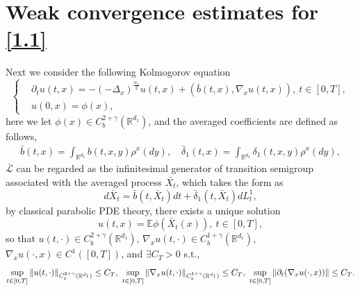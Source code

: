 \documentclass[11pt,reqno]{amsart}
\numberwithin{equation}{section}
\begin{document}
\section{Weak convergence estimates for \ref{1.1}}\label{wea-est}


Next we consider the following Kolmogorov equation
\begin{equation}\label{6.10}
	\left\{
	\begin{aligned}
		&\partial_{t}u(t,x)=	-(-\Delta_{x})^{\frac{\alpha_{1}}{2}}u(t,x)+( \bar{b}(t,x),\nabla_{x}u(t,x)) ,\ t\in[0,T],\\
		&u(0,x)=\phi(x),
	\end{aligned}
	\right.
\end{equation}
here we let  $\phi(x)\in C^{2+\gamma}_{b}(\mathbb{R}^{d_{1}})$, and the averaged coefficients are defined as follows, 
\begin{align*}
	\bar{b}(t,x)=\int_{\mathbb{R}^{d_{2}}}b(t,x,y)\rho^{x}(dy), \quad \bar{\delta}_{1}(t,x)=\int_{\mathbb{R}^{d_{2}}}\delta_{1}(t,x,y)\rho^{x}(dy),
\end{align*}
$\mathcal{\bar{L}}$ can be regarded as the infinitesimal generator of transition semigroup associated with the averaged process $\bar{X_{t}}$,  which takes the form as $$d\bar{X}_{t}=\bar{b}(t,\bar{X}_{t})dt+\bar{\delta}_{1}(t,\bar{X}_{t})dL_{t}^{1},$$by classical parabolic PDE theory, there exists a unique solution 
\begin{equation}\label{6.11}
	u(t,x)=\mathbb{E}\phi(\bar{X}_{t}(x)),\ t\in[0,T],
\end{equation}
so that $u(t,\cdot)\in C_{b}^{2+\gamma}(\mathbb{R}^{d_{1}})$, $\nabla_{x}u(t,\cdot)\in C_{b}^{1+\gamma}(\mathbb{R}^{d_{1}})$, $\nabla_{x}u(\cdot,x)\in C^{1}([0,T])$, and $\exists C_{T}>0$ s.t.,
\begin{equation}\label{6.12}
	\sup_{t\in [0,T]}\Arrowvert u(t,\cdot)\Arrowvert_{C_{b}^{2+\gamma}(\mathbb{R}^{d_{1}})}\leq C_{T},\  
	\sup_{t\in [0,T]}\Arrowvert \nabla_{x}u(t,\cdot)\Arrowvert_{C_{b}^{1+\gamma}(\mathbb{R}^{d_{1}})}\leq C_{T},\
	 \sup_{t\in [0,T]}\Arrowvert \partial_{t}(\nabla_{x}u(\cdot,x))\Arrowvert\leq C_{T}.
\end{equation}
\end{document}
